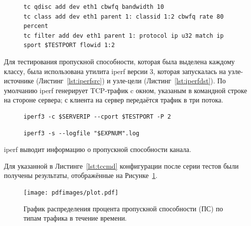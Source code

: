         \begin{figure}[ht!]
    		\center
    		\begin{lstlisting}[frame=lines,
    						  caption={Список команд для конфигурации дисциплины обслуживания CBWFQ.},
    						  label={lst:tccmd},
    						  style=tcstyle]
tc qdisc add dev eth1 cbwfq bandwidth 10
tc class add dev eth1 parent 1: classid 1:2 cbwfq rate 80 percent 
tc filter add dev eth1 parent 1: protocol ip u32 match ip sport $TESTPORT flowid 1:2
    		\end{lstlisting}
        \end{figure}

		Для тестирования пропускной способности, которая была выделена каждому классу,
		была использована утилита iperf версии 3, которая запускалась на узле-источнике (Листинг~\ref{lst:iperfsrc}) и
		узле-цели (Листинг~\ref{lst:iperfdst}). По умолчанию iperf генерирует TCP-трафик c окном,
		указаным в командной строке на стороне сервера; с клиента на сервер передаётся трафик в три потока.

        \begin{figure}[ht!]
    		\center
    		\begin{lstlisting}[frame=lines,
    						  caption={Команда iperf на узле-источнике (клиентская сторона).},
    						  label={lst:iperfsrc}]
iperf3 -c $SERVERIP --cport $TESTPORT -P 2
    		\end{lstlisting}
        \end{figure}	

        \begin{figure}[ht!]
    		\center
    		\begin{lstlisting}[frame=lines,
    						  caption={Команда iperf на узле-цели (серверная сторона).},
    						  label={lst:iperfdst}]
iperf3 -s --logfile "$EXPNUM".log
    		\end{lstlisting}
        \end{figure}

		iperf выводит информацию о пропускной способности канала. 

		Для указанной в Листинге~\ref{lst:tccmd}
		конфигурации после серии тестов были получены результаты, отображённые на Рисунке~\ref{pic:plot}.

        \begin{figure}[ht!]
        	\center
        	\texttt{[image: pdfimages/plot.pdf]}
        	\caption{График распределения процента пропускной способности (ПС) по типам трафика в течение времени.}
			\label{pic:plot}
        \end{figure}
